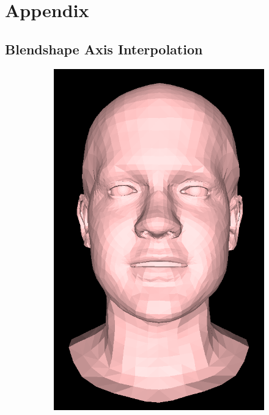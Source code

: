 \chapter*{Appendix}

\section*{Blendshape Axis Interpolation}

\begin{figure}[h]
    \centering
    \begin{subfigure}[b]{0.24\textwidth}
        \includegraphics[width=\textwidth]{figures/blendshape_interp/3/00001.png}

\end{subfigure}
\end{figure}
